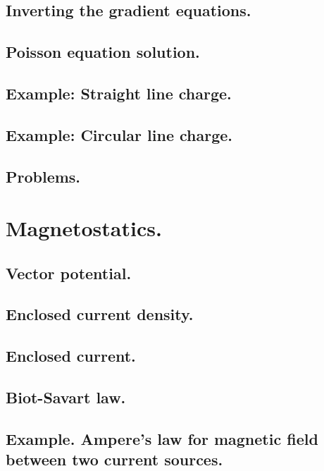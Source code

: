          \subsection{Inverting the gradient equations.}
            
         \subsection{Poisson equation solution.}
            
         \subsection{Example: Straight line charge.}
            
         \subsection{Example: Circular line charge.}
            
         \subsection{Problems.}
            
      \section{Magnetostatics.}
         
         \subsection{Vector potential.}
            
         \subsection{Enclosed current density.}
            
         \subsection{Enclosed current.}
            
         \subsection{Biot-Savart law.}
            
         \subsection{Example.  Ampere's law for magnetic field between two current sources.}
            

